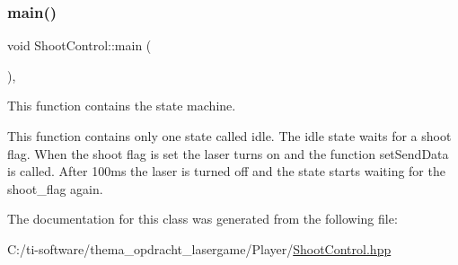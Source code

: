 \subsubsection{\texorpdfstring{main()}{main()}}
{\footnotesize\ttfamily void Shoot\+Control\+::main (\begin{DoxyParamCaption}{ }\end{DoxyParamCaption})\hspace{0.3cm}{\ttfamily [inline]}, {\ttfamily [override]}}



This function contains the state machine. 

This function contains only one state called idle. The idle state waits for a shoot flag. When the shoot flag is set the laser turns on and the function set\+Send\+Data is called. After 100ms the laser is turned off and the state starts waiting for the shoot\+\_\+flag again. 

The documentation for this class was generated from the following file\+:\begin{DoxyCompactItemize}
\item 
C\+:/ti-\/software/thema\+\_\+opdracht\+\_\+lasergame/\+Player/\mbox{\hyperlink{_shoot_control_8hpp}{Shoot\+Control.\+hpp}}\end{DoxyCompactItemize}

